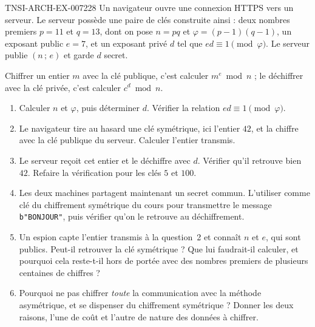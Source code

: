 \begin{exercice}{TNSI-ARCH-EX-007}{2}{28}
Un navigateur ouvre une connexion HTTPS vers un serveur. Le serveur possède une
paire de clés construite ainsi : deux nombres premiers $p=11$ et $q=13$, dont on
pose $n=pq$ et $\varphi=(p-1)(q-1)$, un exposant public $e=7$, et un exposant
privé $d$ tel que $ed\equiv 1 \pmod{\varphi}$. Le serveur publie $(n\,;\,e)$ et
garde $d$ secret.

Chiffrer un entier $m$ avec la clé publique, c'est calculer $m^e \bmod n$ ; le
déchiffrer avec la clé privée, c'est calculer $c^d \bmod n$.
\begin{enumerate}
  \item Calculer $n$ et $\varphi$, puis déterminer $d$. Vérifier la relation
    $ed\equiv 1 \pmod{\varphi}$.
  \item Le navigateur tire au hasard une clé symétrique, ici l'entier $42$, et
    la chiffre avec la clé publique du serveur. Calculer l'entier transmis.
  \item Le serveur reçoit cet entier et le déchiffre avec $d$. Vérifier qu'il
    retrouve bien $42$. Refaire la vérification pour les clés $5$ et $100$.
  \item Les deux machines partagent maintenant un secret commun. L'utiliser
    comme clé du chiffrement symétrique du cours pour transmettre le message
    \lstinline{b"BONJOUR"}, puis vérifier qu'on le retrouve au déchiffrement.
  \item Un espion capte l'entier transmis à la question~2 et connaît $n$ et $e$,
    qui sont publics. Peut-il retrouver la clé symétrique ? Que lui faudrait-il
    calculer, et pourquoi cela reste-t-il hors de portée avec des nombres
    premiers de plusieurs centaines de chiffres ?
  \item Pourquoi ne pas chiffrer \emph{toute} la communication avec la méthode
    asymétrique, et se dispenser du chiffrement symétrique ? Donner les deux
    raisons, l'une de coût et l'autre de nature des données à chiffrer.
\end{enumerate}
\end{exercice}
